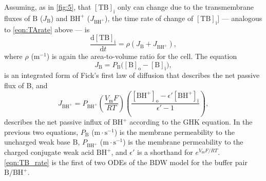 \documentclass[fleqn,10pt]{physiome}
\begin{document}
Assuming, as in \autoref{fig:5}, that $\mathrm{[TB]_i}$ only can change due to the transmembrane fluxes of $\mathrm{B}$ ($J_\mathrm{B}$) and $\mathrm{BH^+}$ ($J_{\mathrm{BH^+}}$), the time rate of change of $\mathrm{[TB]_i]}$ --- analogous to \autoref{eqn:TArate} above --- is
\begin{equation}
\dfrac{\mathrm{d[TB]_i}}{\mathrm{d}t}=\rho\left(J_\mathrm{B}+J_\mathrm{BH^+}\right),
\label{eqn:TB_rate}
\end{equation}
where $\rho$ ($\mathrm{m^{-1}}$) is again the area-to-volume ratio for the cell. The equation
\begin{equation}
J_\mathrm{B}=P_\mathrm{B}\bigg(\mathrm{[B]_o}-\mathrm{[B]_i}\bigg),
\label{eqn:J_B}
\end{equation}
is an integrated form of Fick's first law of diffusion that describes the net passive flux of B, and
\begin{equation}
J_\mathrm{BH^+}=P_\mathrm{BH^+}\left(\dfrac{V_\mathrm{m}F}{RT}\right)\left(\dfrac{\mathrm{[BH^+]_o}-\epsilon '\mathrm{[BH^+]_i}}{\epsilon '-1}\right),
\label{eqn:J_BH}
\end{equation}
describes the net passive influx of $\mathrm{BH^+}$ according to the GHK equation. In the previous two equations, $P_\mathrm{B}$ ($\mathrm{m\cdot s^{-1}}$) is the membrane permeability to the uncharged weak base $\mathrm{B}$, $P_\mathrm{{BH^+}}$ ($\mathrm{m\cdot s^{-1}}$) is the membrane permeability to the charged conjugate weak acid $\mathrm{BH^+}$, and $\epsilon '$ is a shorthand for $e^{{V_\mathrm{m}F}/{RT}}$. \autoref{eqn:TB_rate} is the first of two ODEs of the BDW model for the buffer pair $\mathrm{B}/\mathrm{BH^+}$.
\end{document}
